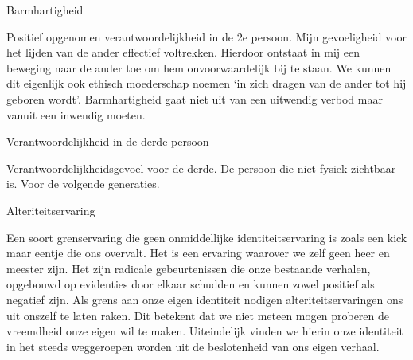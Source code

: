 \documentclass[main.tex]{subfiles}
\begin{document}
\begin{examenvraag}
    \begin{vraag}
        Barmhartigheid
    \end{vraag}

    \begin{antwoord}
        Positief opgenomen verantwoordelijkheid in de‭ ‬2e persoon.‭ ‬Mijn gevoeligheid voor het lijden van 
        de ander effectief voltrekken.‭ ‬Hierdoor ontstaat in mij een beweging naar de ander toe om hem 
        onvoorwaardelijk bij te staan.‭ ‬We kunnen dit eigenlijk ook ethisch moederschap noemen‭ ‬‘in zich 
        dragen van de ander tot hij geboren wordt‭’‬.‭ ‬Barmhartigheid gaat niet uit van een uitwendig 
        verbod maar vanuit een inwendig moeten.
    \end{antwoord}
\end{examenvraag}


\begin{examenvraag}
    \begin{vraag}
        Verantwoordelijkheid in de derde persoon
    \end{vraag}

    \begin{antwoord}
        Verantwoordelijkheidsgevoel voor de derde. 
        De persoon die niet fysiek zichtbaar is.
        Voor de volgende generaties.
    \end{antwoord}
\end{examenvraag}


\begin{examenvraag}
    \begin{vraag}
        Alteriteitservaring
    \end{vraag}

    \begin{antwoord}
        Een soort grenservaring die geen onmiddellijke identiteitservaring is zoals een kick maar 
        eentje die ons overvalt.‭ ‬Het is een ervaring waarover we zelf geen heer en meester zijn.‭ ‬Het 
        zijn radicale gebeurtenissen die onze bestaande verhalen,‭ ‬opgebouwd op evidenties door elkaar 
        schudden en kunnen zowel positief als negatief zijn.‭ ‬Als grens aan onze eigen identiteit 
        nodigen alteriteitservaringen ons uit onszelf te laten raken.‭ ‬Dit betekent dat we niet meteen 
        mogen proberen de vreemdheid onze eigen wil te maken.‭ ‬Uiteindelijk vinden we hierin onze 
        identiteit in het steeds weggeroepen worden uit de beslotenheid van ons eigen verhaal.
    \end{antwoord}
\end{examenvraag}
\end{document}
